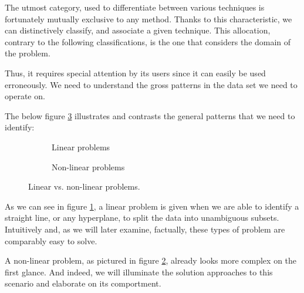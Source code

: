 The utmost category, used to differentiate between various techniques is fortunately mutually exclusive to any method.
Thanks to this characteristic, we can distinctively classify, and associate a given technique.
This allocation, contrary to the following classifications, is the one that considers the domain of the problem.

Thus, it requires special attention by its users since it can easily be used erroneously.
We need to understand the gross patterns in the data set we need to operate on.
\medskip

The below figure \ref{fig:linearvsnonlinearproblems} illustrates and contrasts the general patterns that we need to identify:\vspace*{4mm}

\renewcommand{\tikzscale}{1.18}
\begin{figure}[h]
	\begin{subfigure}{0.48\textwidth}
	    \caption{Linear problems}
		
	    \label{subfig:linearproblems}
	\end{subfigure}
	\hfill
	\begin{subfigure}{0.48\textwidth}
	    \caption{Non-linear problems}
		
	    \label{subfig:nonlinearproblems}
	\end{subfigure}
\caption{Linear vs. non-linear problems.}
\label{fig:linearvsnonlinearproblems}
\end{figure}

As we can see in figure \ref{subfig:linearproblems}, a linear problem is given when we are able to identify a straight line, or any \gls{hyperplane}, to split the data into unambiguous subsets.
Intuitively and, as we will later examine, factually, these types of problem are comparably easy to solve.

A non-linear problem, as pictured in figure \ref{subfig:nonlinearproblems}, already looks more complex on the first glance.
And indeed, we will illuminate the solution approaches to this scenario and elaborate on its comportment.
